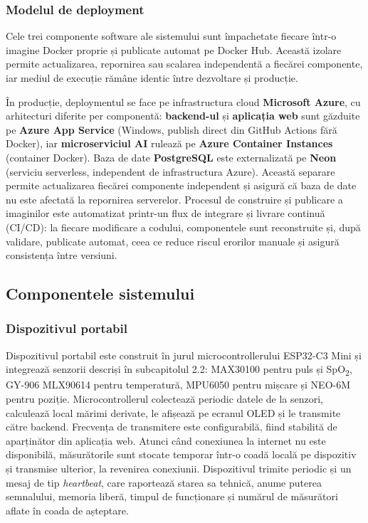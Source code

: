 \documentclass[12pt,a4paper,twoside]{article}
\newcommand{\spo}{SpO\textsubscript{2}}
\begin{document}
\subsubsection{Modelul de deployment}

Cele trei componente software ale sistemului sunt împachetate fiecare într-o imagine Docker proprie și publicate automat pe Docker Hub. Această izolare permite actualizarea, repornirea sau scalarea independentă a fiecărei componente, iar mediul de execuție rămâne identic între dezvoltare și producție.

În producție, deploymentul se face pe infrastructura cloud \textbf{Microsoft Azure}, cu arhitecturi diferite per componentă: \textbf{backend-ul} și \textbf{aplicația web} sunt găzduite pe \textbf{Azure App Service} (Windows, publish direct din GitHub Actions fără Docker), iar \textbf{microserviciul AI} rulează pe \textbf{Azure Container Instances} (container Docker). Baza de date \textbf{PostgreSQL} este externalizată pe \textbf{Neon} (serviciu serverless, independent de infrastructura Azure). Această separare permite actualizarea fiecărei componente independent și asigură că baza de date nu este afectată la repornirea serverelor. Procesul de construire și publicare a imaginilor este automatizat printr-un flux de integrare și livrare continuă (CI/CD): la fiecare modificare a codului, componentele sunt reconstruite și, după validare, publicate automat, ceea ce reduce riscul erorilor manuale și asigură consistența între versiuni.

\subsection{Componentele sistemului}

\subsubsection{Dispozitivul portabil}

Dispozitivul portabil este construit în jurul microcontrollerului ESP32-C3 Mini și integrează senzorii descriși în subcapitolul 2.2: MAX30100 pentru puls și \spo, GY-906 MLX90614 pentru temperatură, MPU6050 pentru mișcare și NEO-6M pentru poziție. Microcontrollerul colectează periodic datele de la senzori, calculează local mărimi derivate, le afișează pe ecranul OLED și le transmite către backend. Frecvența de transmitere este configurabilă, fiind stabilită de aparținător din aplicația web. Atunci când conexiunea la internet nu este disponibilă, măsurătorile sunt stocate temporar într-o coadă locală pe dispozitiv și transmise ulterior, la revenirea conexiunii. Dispozitivul trimite periodic și un mesaj de tip \textit{heartbeat}, care raportează starea sa tehnică, anume puterea semnalului, memoria liberă, timpul de funcționare și numărul de măsurători aflate în coada de așteptare.
\end{document}
